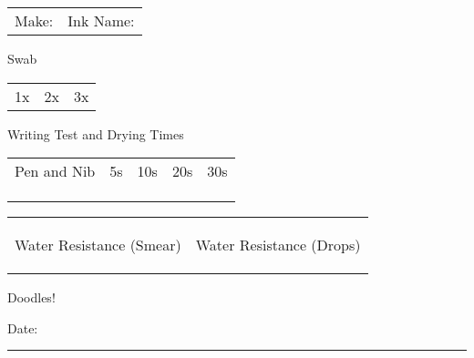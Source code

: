 \documentclass[letterpaper,12pt]{memoir}
\begin{document}
\begin{tabularx}{\textwidth}{@{}XX@{}}
Make: \textcolor{lightgray}{\hrulefill} & Ink Name: \textcolor{lightgray}{\hrulefill}
\end{tabularx}

\begin{prettyframed}{Swab}
  \begin{tabularx}{\textwidth}{@{}XXX@{}}
    1x & 2x & 3x
  \end{tabularx}
  \vspace{8mm}
\end{prettyframed}

\begin{prettyframed}{Writing Test and Drying Times}
  \begin{tabularx}{\textwidth}{@{}X!{\textcolor{lightgray}{\vrule}}p{1.5cm}@{}p{1.5cm}@{}p{1.5cm}@{}p{1.5cm}@{}}
    Pen and Nib & 5s & 10s & 20s & 30s \\[8mm]
    \textcolor{lightgray}{\hrulefill} & & & & \\[8mm]
    \textcolor{lightgray}{\hrulefill} & & & & \\[8mm]
    \textcolor{lightgray}{\hrulefill} & & & &
  \end{tabularx}
\end{prettyframed}

\vspace{-1em}
\begin{tabularx}{\textwidth}{@{}XX@{}}
  \begin{prettyframed}{Water Resistance (Smear)}
    \begin{minipage}[t][1.5in][t]{\textwidth}
    \end{minipage}
  \end{prettyframed} &
                       \begin{prettyframed}{Water Resistance (Drops)}
                         \begin{minipage}[t][1.5in][t]{\textwidth}
                         \end{minipage}
                       \end{prettyframed}
\end{tabularx}
\vspace{-3em}

\begin{prettyframed}{Doodles!}
  \vspace{2in}
\end{prettyframed}

\vfill

\hfill Date: \textcolor{lightgray}{\rule{5cm}{0.4pt}}
\end{document}
